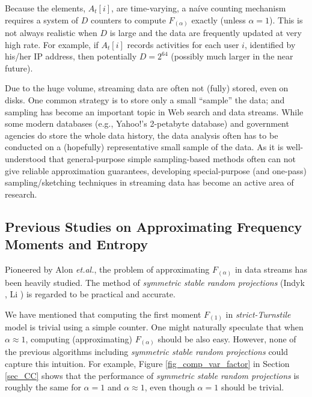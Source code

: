 \documentclass{sig-alternate}
\begin{document}
Because the elements, $A_t[i]$, are time-varying,  a na\'ive counting mechanism requires a system of $D$ counters to compute $F_{(\alpha)}$ exactly (unless $\alpha=1$). This is not always realistic when $D$ is large and the data are  frequently updated at very high rate.  For example, if $A_t[i]$ records activities for each user $i$, identified by his/her IP address, then potentially $D = 2^{64}$ (possibly much larger in the near future).

Due to the huge volume, streaming data are often not (fully) stored, even on disks\cite{Proc:Babcock_PODS02}.  One common strategy is to store only a small ``sample'' the data; and sampling has become an important topic in Web search and data streams\cite{Proc:Henzinger_WWW00,Proc:Bar-Yossef_VLDB00,Article:Henzinger_03}. While some modern databases (e.g., Yahoo!'s 2-petabyte database) and government agencies do store the whole data history, the data analysis  often has to be conducted on a (hopefully) representative small sample of the data. As it is well-understood that  general-purpose simple sampling-based methods often can not give reliable approximation guarantees\cite{Proc:Babcock_PODS02}, developing special-purpose (and one-pass) sampling/sketching techniques in streaming data has become an active area of research.

\subsection{Previous Studies on Approximating Frequency Moments and Entropy}

Pioneered by Alon {\it et.al.}\cite{Proc:Alon_STOC96}, the problem of approximating $F_{(\alpha)}$ in data streams has been heavily studied\cite{Proc:Feigenbaum_FOCS99,Proc:Indyk_FOCS00,Proc:Saks_STOC02,Proc:Kumar_FOCS02,Proc:Indyk_STOC05,Proc:Woodruff_SODA04,Proc:Ganguly_RANDOM07}. The method of {\em symmetric stable random projections} (Indyk \cite{Article:Indyk_JACM06}, Li \cite{Proc:Li_SODA08}) is regarded to be  practical and accurate.

We have mentioned that computing the first moment $F_{(1)}$ in {\em strict-Turnstile} model is trivial using a simple counter. One might naturally speculate that when $\alpha\approx 1$, computing (approximating) $F_{(\alpha)}$ should be also easy. However, none of the previous algorithms including {\em symmetric stable random projections} could capture this intuition. For example, Figure \ref{fig_comp_var_factor} in Section \ref{sec_CC} shows that the performance of {\em symmetric stable random projections} is roughly the same for $\alpha=1$ and $\alpha\approx 1$, even though $\alpha=1$ should be trivial.
\end{document}
